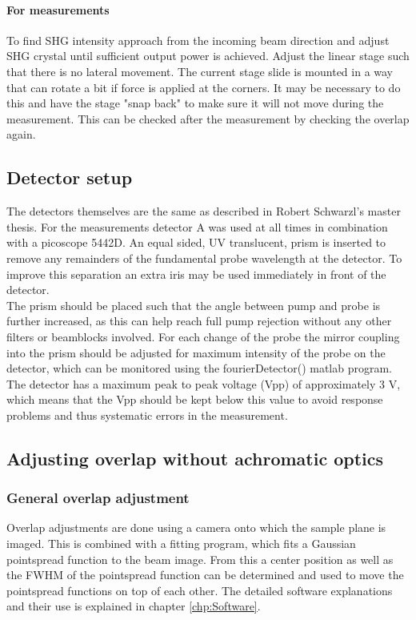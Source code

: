 \documentclass[twoside,openright]{scrreprt}
\begin{document}
\paragraph{For measurements}
To find SHG intensity approach from the incoming beam direction and adjust SHG crystal until sufficient output power is achieved.\newline
Adjust the linear stage such that there is no lateral movement. The current stage slide is mounted in a way that can rotate a bit if force is applied at the corners. It may be necessary to do this and have the stage "snap back" to make sure it will not move during the measurement. This can be checked after the measurement by checking the overlap again.
\subsection{Detector setup}
The detectors themselves are the same as described in Robert Schwarzl's master thesis.\cite{Schwarzl2021} For the measurements detector A was used at all times in combination with a picoscope 5442D. An equal sided, UV translucent, prism is inserted to remove any remainders of the fundamental probe wavelength at the detector. To improve this separation an extra iris may be used immediately in front of the detector.\\
The prism should be placed such that the angle between pump and probe is further increased, as this can help reach full pump rejection without any other filters or beamblocks involved. For each change of the probe the mirror coupling into the prism should be adjusted for maximum intensity of the probe on the detector, which can be monitored using the fourierDetector() matlab program.\\
The detector has a maximum peak to peak voltage (Vpp) of approximately 3 V, which means that the Vpp should be kept below this value to avoid response problems and thus systematic errors in the measurement.
\subsection{Adjusting overlap without achromatic optics}

\subsubsection{General overlap adjustment}
Overlap adjustments are done using a camera onto which the sample plane is imaged. This is combined with a fitting program, which fits a Gaussian pointspread function to the beam image. From this a center position as well as the FWHM of the pointspread function can be determined and used to move the pointspread functions on top of each other. The detailed software explanations and their use is explained in chapter \ref{chp:Software}.\\
\end{document}
